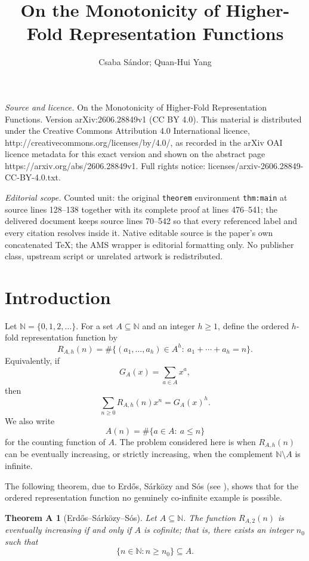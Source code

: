 \documentclass[10pt,a4paper]{amsart}
\newtheorem*{theoremA}{Theorem A}
\begin{document}
\title[On the Monotonicity of Higher-Fold Representation Functions]{On the Monotonicity of Higher-Fold Representation Functions}
\author{Csaba Sándor; Quan-Hui Yang}
\date{}
\maketitle
\noindent\emph{Source and licence.} On the Monotonicity of Higher-Fold Representation Functions. Version arXiv:2606.28849v1 (CC BY 4.0). This material is distributed under the Creative Commons Attribution 4.0 International licence, http://creativecommons.org/licenses/by/4.0/, as recorded in the arXiv OAI licence metadata for this exact version and shown on the abstract page https://arxiv.org/abs/2606.28849v1. Full rights notice: licenses/arxiv-2606.28849-CC-BY-4.0.txt.\par\smallskip
\noindent\textit{Editorial scope.} Counted unit: the original \texttt{theorem} environment \texttt{thm:main} at source lines 128--138 together with its complete proof at lines 476--541; the delivered document keeps source lines 70--542 so that every referenced label and every citation resolves inside it. Native editable source is the paper's own concatenated TeX; the AMS wrapper is editorial formatting only. No publisher class, upstream script or unrelated artwork is redistributed.
\section{Introduction}

Let $\mathbb N=\{0,1,2,\ldots\}$. For a set $A\subseteq \mathbb N$ and an integer $h\ge 1$, define the ordered $h$-fold representation function by
\[
R_{A,h}(n)=\#\{(a_1,\ldots,a_h)\in A^h:\ a_1+\cdots+a_h=n\}.
\]
Equivalently, if
\[
G_A(x)=\sum_{a\in A}x^a,
\]
then
\[
\sum_{n\ge 0}R_{A,h}(n)x^n=G_A(x)^h.
\]
We also write
\[
A(n)=\#\{a\in A:\ a\le n\}
\]
for the counting function of $A$. The problem considered here is when $R_{A,h}(n)$ can be eventually increasing, or strictly increasing, when the complement $\mathbb N\setminus A$ is infinite.

The following theorem, due to Erd\H{o}s, S\'{a}rk\"{o}zy and S\'{o}s (see \cite{ESS4,ESS5}), shows that for the ordered representation function no genuinely co-infinite example is possible.

\begin{theoremA}[Erd\H{o}s--S\'{a}rk\"{o}zy--S\'{o}s]
Let $A\subseteq \mathbb N$. The function $R_{A,2}(n)$ is eventually increasing if and only if $A$ is cofinite; that is, there exists an integer $n_0$ such that
\[
\{n\in\mathbb N:n\ge n_0\}\subseteq A.
\]
\end{theoremA}
\end{document}
